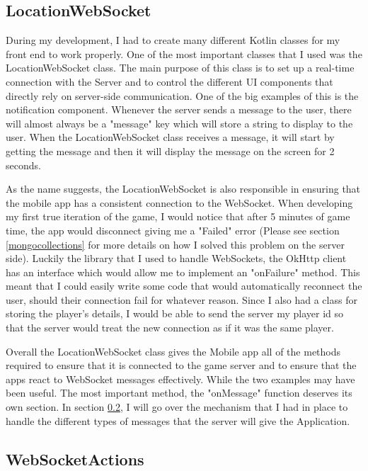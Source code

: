 \documentclass{l4proj}
\begin{document}
\subsection{LocationWebSocket}
During my development, I had to create many different Kotlin classes for my front end to work properly.
One of the most important classes that I used was the LocationWebSocket class. The main purpose of this class is to set up a
real-time connection with the Server and to control the different UI components that directly rely on server-side communication.
One of the big examples of this is the notification component. Whenever the server sends a message to the user, there will almost
always be a "message" key which will store a string to display to the user. When the LocationWebSocket class receives a message, it 
will start by getting the message and then it will display the message on the screen for 2 seconds.

As the name suggests, the LocationWebSocket is also responsible in ensuring that the mobile app has a consistent connection to the
WebSocket. When developing my first true iteration of the game, I would notice that after 5 minutes of game time, 
the app would disconnect giving me a "Failed" error (Please see section \ref{mongocollections} for more details on how I solved this problem on the server side). 
Luckily the library that I used to handle WebSockets, the OkHttp client \citep{okhttp} has an
interface which would allow me to implement an "onFailure" method. This meant that I could easily write some code that would automatically
reconnect the user, should their connection fail for whatever reason. Since I also had a class for storing the player's
details, I would be able to send the server my player id so that the server would treat the new connection as if it was
the same player.

Overall the LocationWebSocket class gives the Mobile app all of the methods required to ensure that it is connected to the game
server and to ensure that the apps react to WebSocket messages effectively. While the two examples may have been useful. The most
important method, the "onMessage" function deserves its own section. In section \ref{websocketactions}, I will go over the mechanism
that I had in place to handle the different types of messages that the server will give the Application.

\subsection{WebSocketActions}
\label{websocketactions}
\end{document}
